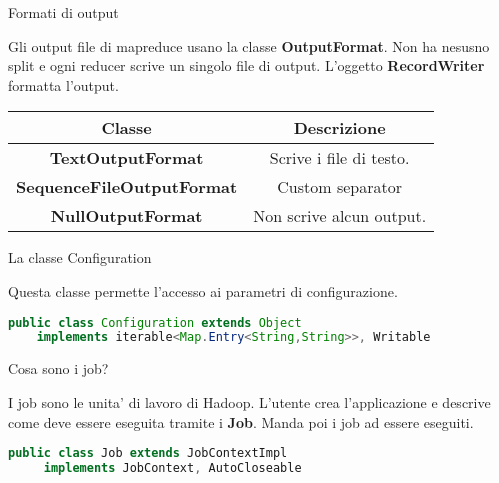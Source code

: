 \begin{domanda}
    Formati di output
\end{domanda}

Gli output file di mapreduce usano la classe \textbf{OutputFormat}. Non ha
nesusno split e ogni reducer scrive un singolo file di output. L'oggetto
\textbf{RecordWriter} formatta l'output.

\begin{table}
    \begin{center}
        \begin{tabular}{|c|c|}
            \hline
            \textbf{Classe}                   & \textbf{Descrizione}                                                                                 \\
            \hline
            \textbf{TextOutputFormat}         & Scrive i file di testo.                                                                              \\
            \hline
            \textbf{SequenceFileOutputFormat} & Custom separator \\
            \hline
            \textbf{NullOutputFormat}         & Non scrive alcun output.                                                                             \\
            \hline
        \end{tabular}
    \end{center}
\end{table}

\begin{domanda}
    La classe Configuration
\end{domanda}

Questa classe permette l'accesso ai parametri di configurazione.
\begin{lstlisting}[language=java]
    public class Configuration extends Object 
    implements iterable<Map.Entry<String,String>>, Writable
\end{lstlisting}

\begin{domanda}
    Cosa sono i job?
\end{domanda}

I job sono le unita' di lavoro di Hadoop. L'utente crea l'applicazione e descrive come deve essere eseguita tramite i \textbf{Job}. Manda poi i job ad essere eseguiti.

\begin{lstlisting}[language=Java]
    public class Job extends JobContextImpl
     implements JobContext, AutoCloseable
\end{lstlisting}

